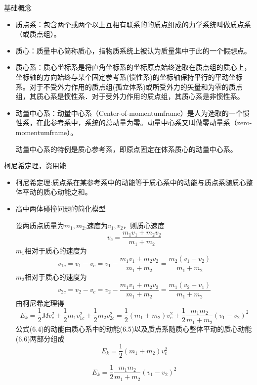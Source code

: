 \documentclass[cn,10.5pt,chinese,mac,chinesefont=founder]{elegantbook}
\begin{document}
\begin{problemset}
	\item 基础概念
	\begin{itemize}
		\item 质点系：包含两个或两个以上互相有联系的的质点组成的力学系统叫做质点系（或质点组）。
		\item 质心：质量中心简称质心，指物质系统上被认为质量集中于此的一个假想点。
		\item 质心系：质心坐标系是将直角坐标系的坐标原点始终选取在质点组的质心上，坐标轴的方向始终与某个固定参考系(惯性系)的坐标轴保持平行的平动坐标系。对于不受外力作用的质点组(孤立体系)或所受外力的矢量和为零的质点组，其质心系是惯性系．对于受外力作用的质点组，其质心系是非惯性系。
		\item 动量中心系：动量中心系（Center-of-momentumframe）是人为选取的一个惯性系，在此参考系中，系统的总动量为零。动量中心系又叫做零动量系（zero-momentumframe）。
		
		动量中心系的特例是质心参考系，即原点固定在体系质心的动量中心系。
	\end{itemize}
	\item 柯尼希定理，资用能
	\begin{itemize}
		\item 柯尼希定理:质点系在某参考系中的动能等于质心系中的动能与质点系随质心整体平动的质心动能之和。
		\item 高中两体碰撞问题的简化模型
		
		设两质点质量为$m_1,m_2$,速度为$v_1,v_2$，则质心速度
		\begin{equation}
			v_c=\dfrac{m_{1} v_{1}+m_{2} v_{2}}{m_{1}+m_{2}}
		\end{equation}
		$m_1$相对于质心的速度为
		\begin{equation}
			v_{1c}=v_1-v_c=v_1-\dfrac{m_{1} v_{1}+m_{2} v_{2}}{m_{1}+m_{2}}=\dfrac{m_2(v_1-v_2)}{m_1+m_2}
		\end{equation}
		$m_2$相对于质心的速度为
		\begin{equation}
			v_{2c}=v_2-v_c=v_2-\dfrac{m_{1} v_{1}+m_{2} v_{2}}{m_{1}+m_{2}}=\dfrac{m_1(v_2-v_1)}{m_1+m_2}
		\end{equation}
		由柯尼希定理得
		\begin{equation}
			E_k=\dfrac{1}{2}Mv_c^2+\dfrac{1}{2}m_1v_{1c}^2+\dfrac{1}{2}m_2v_{2c}^2=\dfrac{1}{2}(m_1+m_2)v_c^2+\dfrac{1}{2}\dfrac{m_1m_2}{m_1+m_2}(v_1-v_2)^2
		\end{equation}
		公式(6.4)的动能由质心系中的动能(6.5)以及质点系随质心整体平动的质心动能(6.6)两部分组成
		\begin{equation}
			E_k=\dfrac{1}{2}(m_1+m_2)v_c^2
		\end{equation}
		
		\begin{equation}
			E_k=\dfrac{1}{2}\dfrac{m_1m_2}{m_1+m_2}(v_1-v_2)^2
		\end{equation}
		
	\end{itemize}
\end{problemset}
\end{document}
